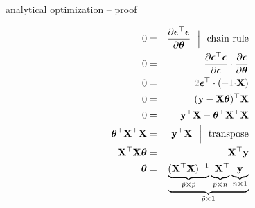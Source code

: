 \documentclass[11pt,compress,t,notes=noshow, xcolor=table]{beamer}
\begin{document}
\begin{vbframe}{analytical optimization -- proof}
\begin{minipage}[t]{0.45\textwidth}
\begin{eqnarray*}
        0 &=& \frac{\partial \bm{\epsilon}^\top \bm{\epsilon} }{\partial 
        \thetav} 
        ~~ \Big \rvert ~~ \text{chain rule} \\
        0 &=& \frac{\partial \bm{\epsilon}^\top \bm{\epsilon}}{\partial 
        \bm{\epsilon}} \cdot \frac{\partial \bm{\epsilon}}{\partial \thetav} \\
        0 &=& \textcolor{black!30}{2}  \bm{\epsilon}^\top \cdot (
        \textcolor{black!30}{-1 \cdot} \Xmat) \\
        0 &=& (\yv - \Xmat \thetav)^\top \Xmat \\
        0 &=& \yv^\top \Xmat - \thetav^\top \Xmat^\top \Xmat \\
        \thetav^\top \Xmat^\top \Xmat &=& \yv^\top \Xmat 
        ~~ \Big \rvert ~~ \text{transpose} \\
        \Xmat^\top \Xmat \thetav &=& \Xmat^\top \yv \\
        \thetav &=& \underbrace{
        \underbrace{(\Xmat^\top \Xmat)^{-1}}_{\tilde p \times \tilde p}
        \underbrace{\phantom{(} \Xmat^\top}_{\tilde p \times n} 
        \underbrace{\yv}_{n \times 1}}_{\tilde p \times 1}
    \end{eqnarray*}
\end{minipage}

\end{vbframe}


\endlecture
\end{document}
